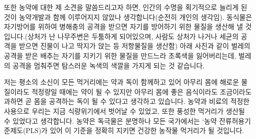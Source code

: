 \documentclass[chapter,book,openany,twoside]{oblivoir}
\begin{document}
\begin{figure}[b]
\centering {}
\qquad
{}
\end{figure}
           

또한 농약에 대한 제 소견을 말씀드리고자 하면, 인간의 수명을 획기적으로 늘리게 된 것이 농약개발과 함께 이루어지지 않았나 생각합니다(순전히 개인의 생각임). 동식물은 자기방어를 위하여 병해충의 공격을 받으면 자기를 방어하기 위한 물질을 생산해 낼 것입니다.(상처가 난 나무주변은 두툼하게 되어있으며, 사람도 상처가 나거나 세균의 공격을 받으면 진물이 나고 딱지가 앉는 등 저항물질을 생산함) 아래 사진과 같이 벌레의 공격을 받은 배추는 자기를 지키기 위한 물질을 만드느라 초록색을 잃어버리는데, 벌레의 공격을 멈춰주면 탐스러운 녹색의 색깔을 가지게 되는 것 같습니다.

저는 평소의 소신이 모든 먹거리에는 약과 독이 함께하고 있어 아무리 몸에 해로운 물질이라도 적정량일 때에는 약이 될 수 있지만 아무리 몸에 좋은 음식이라도 조금이라도 과하면 곧 몸을 공격하는 독이 될 수 있다고 생각하고 있습니다. 농약과 비료의 적정한 사용으로 우리는 지금 식량위기에서 벗어날 수 있었고, 또한 풍성한 먹거리가 생산될 수 있었다고 생각합니다.  농약은 독극물은 분명하나 모든 국가에서는 `농약 잔류허용기준제도(PLS)가 있어 이 기준을 정확히 지키면 건강한 농작물 먹거리가 될 것입니다.
\end{document}
